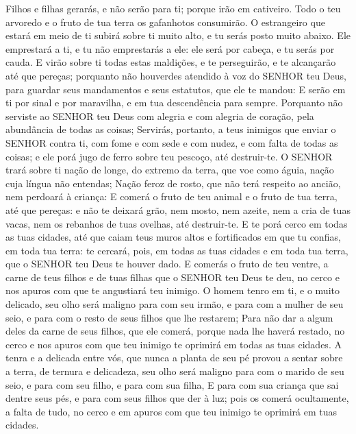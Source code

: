 {{  Filhos e filhas gerarás, e não serão para ti; porque irão em cativeiro.
  Todo o teu arvoredo e o fruto de tua terra os gafanhotos consumirão.
  O estrangeiro que estará em meio de ti subirá sobre ti muito alto, e tu serás posto muito abaixo.
  Ele emprestará a ti, e tu não emprestarás a ele: ele será por cabeça, e tu serás por cauda.
  E virão sobre ti todas estas maldições, e te perseguirão, e te alcançarão até que pereças; porquanto não houverdes atendido à voz do SENHOR teu Deus, para guardar seus mandamentos e seus estatutos, que ele te mandou:
  E serão em ti por sinal e por maravilha, e em tua descendência para sempre.
  Porquanto não serviste ao SENHOR teu Deus com alegria e com alegria de coração, pela abundância de todas as coisas;
  Servirás, portanto, a teus inimigos que enviar o SENHOR contra ti, com fome e com sede e com nudez, e com falta de todas as coisas; e ele porá jugo de ferro sobre teu pescoço, até destruir-te.
  O SENHOR trará sobre ti nação de longe, do extremo da terra, que voe como águia, nação cuja língua não entendas; %
  Nação feroz de rosto, que não terá respeito ao ancião, nem perdoará à criança:
  E comerá o fruto de teu animal e o fruto de tua terra, até que pereças: e não te deixará grão, nem mosto, nem azeite, nem a cria de tuas vacas, nem os rebanhos de tuas ovelhas, até destruir-te.
  E te porá cerco em todas as tuas cidades, até que caiam teus muros altos e fortificados em que tu confias, em toda tua terra: te cercará, pois, em todas as tuas cidades e em toda tua terra, que o SENHOR teu Deus te houver dado. %
  E comerás o fruto de teu ventre, a carne de teus filhos e de tuas filhas que o SENHOR teu Deus te deu, no cerco e nos apuros com que te angustiará teu inimigo.
  O homem tenro em ti, e o muito delicado, seu olho será maligno para com seu irmão, e para com a mulher de seu seio, e para com o resto de seus filhos que lhe restarem;
  Para não dar a algum deles da carne de seus filhos, que ele comerá, porque nada lhe haverá restado, no cerco e nos apuros com que teu inimigo te oprimirá em todas as tuas cidades. %
  A tenra e a delicada entre vós, que nunca a planta de seu pé provou a sentar sobre a terra, de ternura e delicadeza, seu olho será maligno para com o marido de seu seio, e para com seu filho, e para com sua filha,
  E para com sua criança que sai dentre seus pés, e para com seus filhos que der à luz; pois os comerá ocultamente, a falta de tudo, no cerco e em apuros com que teu inimigo te oprimirá em tuas cidades.
}}
